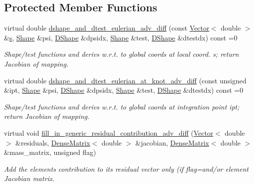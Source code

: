 \subsection*{Protected Member Functions}
\begin{DoxyCompactItemize}
\item 
virtual double \hyperlink{classoomph_1_1AdvectionDiffusionEquations_ac3c3b0bec7f34f53eb330cd777dcbe59}{dshape\+\_\+and\+\_\+dtest\+\_\+eulerian\+\_\+adv\+\_\+diff} (const \hyperlink{classoomph_1_1Vector}{Vector}$<$ double $>$ \&\hyperlink{cfortran_8h_ab7123126e4885ef647dd9c6e3807a21c}{s}, \hyperlink{classoomph_1_1Shape}{Shape} \&psi, \hyperlink{classoomph_1_1DShape}{D\+Shape} \&dpsidx, \hyperlink{classoomph_1_1Shape}{Shape} \&test, \hyperlink{classoomph_1_1DShape}{D\+Shape} \&dtestdx) const =0
\begin{DoxyCompactList}\small\item\em Shape/test functions and derivs w.\+r.\+t. to global coords at local coord. s; return Jacobian of mapping. \end{DoxyCompactList}\item 
virtual double \hyperlink{classoomph_1_1AdvectionDiffusionEquations_a354827df2a149258310ffdd0e4c0d40b}{dshape\+\_\+and\+\_\+dtest\+\_\+eulerian\+\_\+at\+\_\+knot\+\_\+adv\+\_\+diff} (const unsigned \&ipt, \hyperlink{classoomph_1_1Shape}{Shape} \&psi, \hyperlink{classoomph_1_1DShape}{D\+Shape} \&dpsidx, \hyperlink{classoomph_1_1Shape}{Shape} \&test, \hyperlink{classoomph_1_1DShape}{D\+Shape} \&dtestdx) const =0
\begin{DoxyCompactList}\small\item\em Shape/test functions and derivs w.\+r.\+t. to global coords at integration point ipt; return Jacobian of mapping. \end{DoxyCompactList}\item 
virtual void \hyperlink{classoomph_1_1AdvectionDiffusionEquations_a399995609ea6d997496e3bcbdc5383f7}{fill\+\_\+in\+\_\+generic\+\_\+residual\+\_\+contribution\+\_\+adv\+\_\+diff} (\hyperlink{classoomph_1_1Vector}{Vector}$<$ double $>$ \&residuals, \hyperlink{classoomph_1_1DenseMatrix}{Dense\+Matrix}$<$ double $>$ \&jacobian, \hyperlink{classoomph_1_1DenseMatrix}{Dense\+Matrix}$<$ double $>$ \&mass\+\_\+matrix, unsigned flag)
\begin{DoxyCompactList}\small\item\em Add the element\textquotesingle{}s contribution to its residual vector only (if flag=and/or element Jacobian matrix. \end{DoxyCompactList}\end{DoxyCompactItemize}
